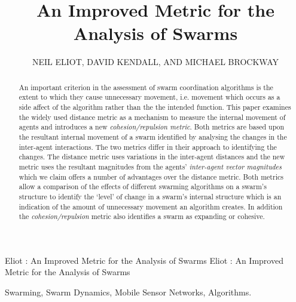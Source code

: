 \documentclass{ieeeaccess}
\begin{document}

\title{An Improved Metric for the Analysis of Swarms}
\author{\uppercase{Neil Eliot},
\uppercase{David Kendall, and Michael Brockway}}
\address[1]{Northumbria University, Department of Computing and Information Sciences, 
Newcastle upon Tyne, NE1 8ST}

\markboth
{Eliot \headeretal: An Improved Metric for the Analysis of Swarms}
{Eliot \headeretal: An Improved Metric for the Analysis of Swarms}



\begin{abstract}
An important criterion in the assessment of swarm coordination algorithms is
the extent to which they cause unnecessary movement, i.e. movement which
occurs as a side affect of the algorithm rather than the the intended
function. This paper examines the widely used distance metric as a mechanism
to measure the internal movement of agents and introduces a new
\emph{cohesion/repulsion metric}.  Both metrics are based upon the resultant
internal movement of a swarm identified by analysing the changes in the
inter-agent interactions. The two metrics differ in their approach to
identifying the changes. The distance metric uses variations in the
inter-agent distances and the new metric uses the resultant magnitudes from
the agents' \emph{inter-agent vector magnitudes}  which we claim offers a
number of advantages over the distance metric.  Both metrics allow a
comparison of the effects of different swarming algorithms on a swarm's
structure to identify the `level' of change in a swarm's internal structure
which is an indication of the amount of unnecessary movement an algorithm
creates.  In addition the \emph{cohesion/repulsion} metric also identifies a
swarm as expanding or cohesive.
\end{abstract}

\begin{keywords}
Swarming, Swarm Dynamics, Mobile Sensor Networks, Algorithms.
\end{keywords}


\titlepgskip=-15pt
\maketitle
\end{document}
